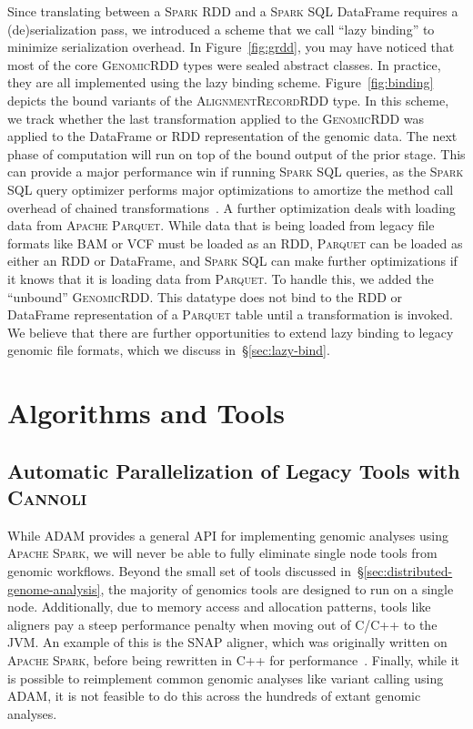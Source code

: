 \documentclass[phd]{ucbthesis}
\begin{document}
Since translating between a \textsc{Spark} RDD and a \textsc{Spark SQL}
DataFrame requires a (de)serialization pass, we introduced a scheme that we call
``lazy binding'' to minimize serialization overhead. In Figure~\ref{fig:grdd},
you may have noticed that most of the core \textsc{GenomicRDD} types were
sealed abstract classes. In practice, they are all implemented using the lazy
binding scheme. Figure~\ref{fig:binding} depicts the bound variants of the
\textsc{AlignmentRecordRDD} type. In this scheme, we track whether the last
transformation applied to the \textsc{GenomicRDD} was applied to the DataFrame
or RDD representation of the genomic data. The next phase of computation will
run on top of the bound output of the prior stage. This can provide a major
performance win if running \textsc{Spark SQL} queries, as the \textsc{Spark SQL}
query optimizer performs major optimizations to amortize the method call
overhead of chained transformations~\cite{armbrust15}. A further optimization
deals with loading data from \textsc{Apache Parquet}. While data that is being
loaded from legacy file formats like BAM or VCF must be loaded as an RDD,
\textsc{Parquet} can be loaded as either an RDD or DataFrame, and \textsc{Spark
  SQL} can make further optimizations if it knows that it is loading data from
\textsc{Parquet}. To handle this, we added the ``unbound'' \textsc{GenomicRDD}.
This datatype does not bind to the RDD or DataFrame representation of a
\textsc{Parquet} table until a transformation is invoked. We believe that there
are further opportunities to extend lazy binding to legacy genomic file formats,
which we discuss in~\S\ref{sec:lazy-bind}.

\part{Algorithms and Tools}

\chapter{Automatic Parallelization of Legacy Tools with \textsc{Cannoli}}
\label{chap:cannoli}

While \textsc{ADAM} provides a general API for implementing genomic analyses
using \textsc{Apache Spark}, we will never be able to fully eliminate single
node tools from genomic workflows. Beyond the small set of tools discussed
in~\S\ref{sec:distributed-genome-analysis}, the majority of genomics tools are
designed to run on a single node. Additionally, due to memory access and
allocation patterns, tools like aligners pay a steep performance penalty when
moving out of C/C++ to the JVM. An example of this is the \textsc{SNAP} aligner,
which was originally written on \textsc{Apache Spark}, before being rewritten in
C++ for performance~\cite{zaharia11}. Finally, while it is possible to
reimplement common genomic analyses like variant calling using \textsc{ADAM}, it
is not feasible to do this across the hundreds of extant genomic analyses.
\end{document}
